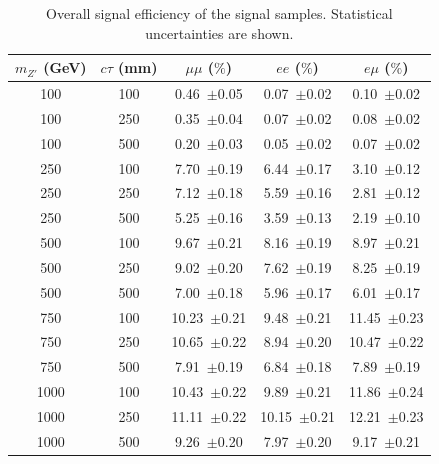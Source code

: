 \begin{table}[!htb]
  \centering
  \begin{tabular}{ c c @{\hspace{1cm}} c @{\hspace{1cm}} c @{\hspace{1cm}} c }
    \hline
    \hline
    $m_{Z'}$ (GeV) & $c\tau$ (mm)    &$\mu\mu$ ($\%$)     & $ee$ ($\%$)     & $e\mu$ ($\%$)     \\
    \hline
    100			   &  100    & 0.46~$\pm$0.05 	& 0.07~$\pm$0.02	&  0.10~$\pm$0.02  \\
    100			   &  250    & 0.35~$\pm$0.04 	& 0.07~$\pm$0.02	&  0.08~$\pm$0.02  \\
    100			   &  500    & 0.20~$\pm$0.03 	& 0.05~$\pm$0.02	&  0.07~$\pm$0.02  \\
    250			   &  100    & 7.70~$\pm$0.19 	& 6.44~$\pm$0.17	&  3.10~$\pm$0.12  \\
    250			   &  250    & 7.12~$\pm$0.18 	& 5.59~$\pm$0.16	&  2.81~$\pm$0.12  \\
    250			   &  500    & 5.25~$\pm$0.16 	& 3.59~$\pm$0.13	&  2.19~$\pm$0.10  \\
    500			   &  100    & 9.67~$\pm$0.21 	& 8.16~$\pm$0.19	&  8.97~$\pm$0.21  \\
    500			   &  250    & 9.02~$\pm$0.20 	& 7.62~$\pm$0.19	&  8.25~$\pm$0.19  \\
    500			   &  500    & 7.00~$\pm$0.18 	& 5.96~$\pm$0.17	&  6.01~$\pm$0.17  \\
    750			   &  100    &10.23~$\pm$0.21	& 9.48~$\pm$0.21	& 11.45~$\pm$0.23  \\
    750			   &  250    &10.65~$\pm$0.22	& 8.94~$\pm$0.20	& 10.47~$\pm$0.22  \\
    750			   &  500    & 7.91~$\pm$0.19 	& 6.84~$\pm$0.18	&  7.89~$\pm$0.19  \\
    1000	           &  100    &10.43~$\pm$0.22	& 9.89~$\pm$0.21	& 11.86~$\pm$0.24  \\
    1000	           &  250    &11.11~$\pm$0.22	&10.15~$\pm$0.21	& 12.21~$\pm$0.23  \\
    1000	           &  500    & 9.26~$\pm$0.20 	& 7.97~$\pm$0.20	&  9.17~$\pm$0.21  \\
    \hline
    \hline
  \end{tabular}
  \caption{Overall signal efficiency of the signal samples. Statistical uncertainties are shown.}
  \label{table:signal_eff}
\end{table}




